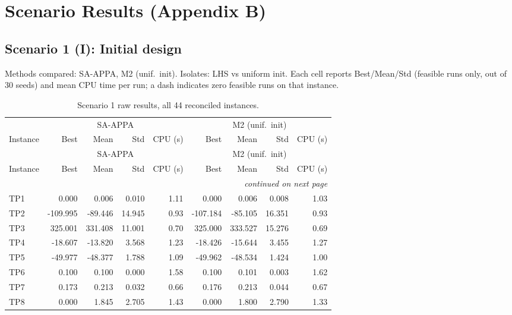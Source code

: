 \section{Scenario Results (Appendix B)}
\label{app:scenarios}

\subsection{Scenario 1 (I): Initial design}
\label{app:scenario1}
Methods compared: SA-APPA, M2 (unif.\ init). Isolates: LHS vs uniform init. Each cell reports Best/Mean/Std (feasible runs only, out of 30 seeds) and mean CPU time per run; a dash indicates zero feasible runs on that instance.

\begingroup\scriptsize
\begin{longtable}{lrrrrrrrr}
\caption{Scenario 1 raw results, all 44 reconciled instances.}\label{tab:scenario1}\\
\toprule
 & \multicolumn{4}{c}{SA-APPA} & \multicolumn{4}{c}{M2 (unif.\ init)} \\
\cmidrule(lr){2-5} \cmidrule(lr){6-9}
Instance & Best & Mean & Std & CPU (s) & Best & Mean & Std & CPU (s) \\
\midrule
\endfirsthead
\toprule
 & \multicolumn{4}{c}{SA-APPA} & \multicolumn{4}{c}{M2 (unif.\ init)} \\
\cmidrule(lr){2-5} \cmidrule(lr){6-9}
Instance & Best & Mean & Std & CPU (s) & Best & Mean & Std & CPU (s) \\
\midrule
\endhead
\midrule\multicolumn{9}{r}{\emph{continued on next page}}\\\midrule
\endfoot
\bottomrule
\endlastfoot
TP1 & 0.000 & 0.006 & 0.010 & 1.11 & 0.000 & 0.006 & 0.008 & 1.03 \\
TP2 & -109.995 & -89.446 & 14.945 & 0.93 & -107.184 & -85.105 & 16.351 & 0.93 \\
TP3 & 325.001 & 331.408 & 11.001 & 0.70 & 325.000 & 333.527 & 15.276 & 0.69 \\
TP4 & -18.607 & -13.820 & 3.568 & 1.23 & -18.426 & -15.644 & 3.455 & 1.27 \\
TP5 & -49.977 & -48.377 & 1.788 & 1.09 & -49.962 & -48.534 & 1.424 & 1.00 \\
TP6 & 0.100 & 0.100 & 0.000 & 1.58 & 0.100 & 0.101 & 0.003 & 1.62 \\
TP7 & 0.173 & 0.213 & 0.032 & 0.66 & 0.176 & 0.213 & 0.044 & 0.67 \\
TP8 & 0.000 & 1.845 & 2.705 & 1.43 & 0.000 & 1.800 & 2.790 & 1.33 \\

\end{longtable}
